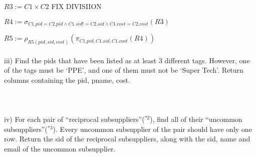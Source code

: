 \documentclass[10pt]{article}
\begin{document}
$R3 := C1 \times C2$ FIX DIVISIION

$R4 := \sigma_{C1.pid = C2.pid \wedge C1.sid != C2.sid \wedge C1.cost = C2.cost}(R3)$

$R5 := \rho_{R5(pid, sid, cost)}(\pi_{C1.pid, C1.sid, C1.cost}(R4))$
\\~\\
iii) Find the pids that have been listed as at least 3 different tags. However, one of the tags must be ‘PPE’, and one of them must not be ‘Super Tech’. Return columns containing the pid, pname, cost. 
\\~\\

\\~\\
iv) For each pair of “reciprocal subsuppliers”($^{*2}$), find all of their “uncommon subsuppliers”($^{*3}$). Every uncommon subsupplier of the pair should have only one row. Return the sid of the reciprocal subsuppliers, along with the sid, name and email of the uncommon subsupplier. 
\\~\\
\end{document}

